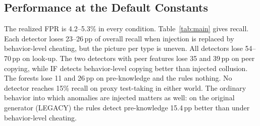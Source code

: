 \documentclass[conference,a4paper]{IEEEtran}
\newcommand{\pp}{\,pp}
\begin{document}
\subsection{Performance at the Default Constants}
The realized FPR is 4.2--5.3\% in every condition. Table~\ref{tab:main} gives recall. Each detector loses 23--26\pp{} of overall recall when injection is replaced by behavior-level cheating, but the picture per type is uneven. All detectors lose 54--70\pp{} on look-up. The two detectors with peer features lose 35 and 39\pp{} on peer copying, while IF detects behavior-level copying better than injected collusion. The forests lose 11 and 26\pp{} on pre-knowledge and the rules nothing. No detector reaches 15\% recall on proxy test-taking in either world. The ordinary behavior into which anomalies are injected matters as well: on the original generator (LEGACY) the rules detect pre-knowledge 15.4\pp{} better than under behavior-level cheating.
\end{document}
